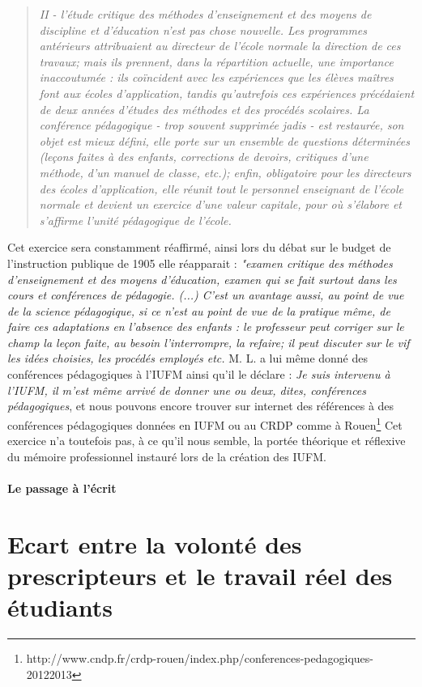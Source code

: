 \documentclass[a4paper,11pt]{article}
\begin{document}
			\begin{quote}
			 \emph{II - l'étude critique des méthodes d'enseignement et des moyens de discipline et d'éducation n'est pas chose nouvelle. Les programmes antérieurs attribuaient au directeur de l'école normale la direction de ces travaux; mais ils prennent, dans la répartition actuelle, une importance inaccoutumée : ils coïncident avec les expériences que les élèves maîtres font aux écoles d'application, tandis qu'autrefois ces expériences précédaient de deux années d'études des méthodes et des procédés scolaires. La conférence pédagogique - trop souvent supprimée jadis - est restaurée, son objet est mieux défini, elle porte sur un ensemble de questions déterminées (leçons faites à des enfants, corrections de devoirs, critiques d'une méthode, d'un manuel de classe, etc.); enfin, obligatoire pour les directeurs des écoles d'application, elle réunit tout le personnel enseignant de l'école normale et devient un exercice d'une valeur capitale, pour où s'élabore et s'affirme l'unité pédagogique de l'école.}
			\end{quote}
			Cet exercice sera constamment réaffirmé, ainsi lors du débat sur le budget de l'instruction publique de 1905 elle réapparait : \emph{"examen critique des méthodes d'enseignement et des moyens d'éducation, examen qui se fait surtout dans les cours et conférences de pédagogie. (...) C'est un avantage aussi, au point de vue de la science pédagogique, si ce n'est au point de vue de la pratique même, de faire ces adaptations en l'absence des enfants : le professeur peut corriger sur le champ la leçon faite, au besoin l'interrompre, la refaire; il peut discuter sur le vif les idées choisies, les procédés employés etc.} M. L. a lui même donné des conférences pédagogiques à l'IUFM ainsi qu'il le déclare : \emph{Je suis intervenu à l'IUFM, il m'est même arrivé de donner une ou deux, dites, conférences pédagogiques}, et nous pouvons encore trouver sur internet des références à des conférences pédagogiques données en IUFM ou au CRDP comme à Rouen\footnote{http://www.cndp.fr/crdp-rouen/index.php/conferences-pedagogiques-20122013}
			Cet exercice n'a toutefois pas, à ce qu'il nous semble, la portée théorique et réflexive du mémoire professionnel instauré lors de la création des IUFM.
			\subsection{Le passage à l'écrit}
			

\part{Ecart entre la volonté des prescripteurs et le travail réel des étudiants}
\end{document}
